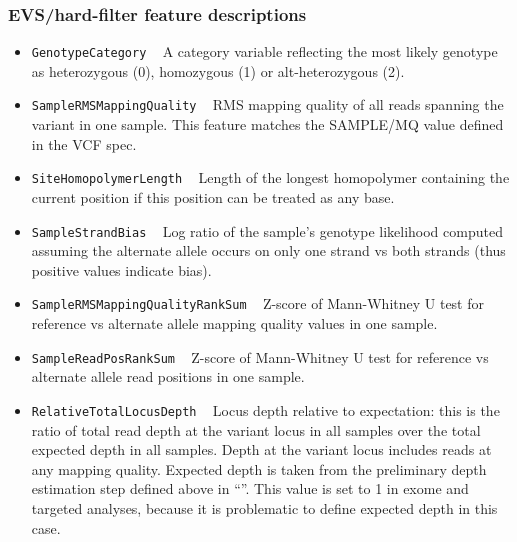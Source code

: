 \documentclass{article}
\begin{document}
\subsubsection{EVS/hard-filter feature descriptions}

\begin{itemize}

\item \texttt{GenotypeCategory} ~ A category variable reflecting the most likely genotype as heterozygous (0), homozygous (1) or alt-heterozygous (2).

\item \texttt{SampleRMSMappingQuality} ~ RMS mapping quality of all reads spanning the variant in one sample. This feature matches the SAMPLE/MQ value defined in the VCF spec.

\item \texttt{SiteHomopolymerLength} ~ Length of the longest homopolymer containing the current position if this position can be treated as any base.

\item \texttt{SampleStrandBias} ~ Log ratio of the sample's genotype likelihood computed assuming the alternate allele occurs on only one strand vs both strands (thus positive values indicate bias).

\item \texttt{SampleRMSMappingQualityRankSum} ~ Z-score of Mann-Whitney U test for reference vs alternate allele mapping quality values in one sample.

\item \texttt{SampleReadPosRankSum} ~ Z-score of Mann-Whitney U test for reference vs alternate allele read positions in one sample.

\item \texttt{RelativeTotalLocusDepth} ~ Locus depth relative to expectation: this is the ratio of total read depth at the variant locus in all samples over the total expected depth in all samples. Depth at the variant locus includes reads at any mapping quality. Expected depth is taken from the preliminary depth estimation step defined above in ``''. This value is set to 1 in exome and targeted analyses, because it is problematic to define expected depth in this case.


\end{itemize}
\end{document}
